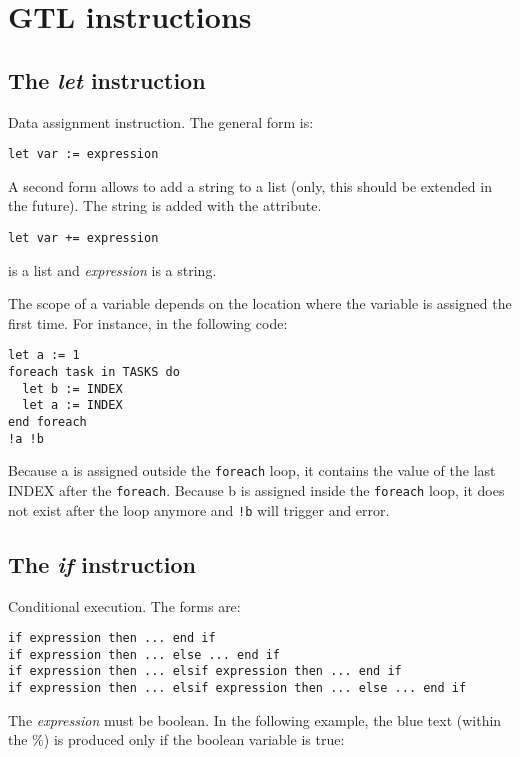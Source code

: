 \section{GTL instructions}

\subsection{The {\em let} instruction}

Data assignment instruction. The general form is:

\begin{lstlisting}
let var := expression
\end{lstlisting}

A second form allows to add a string to a list (only, this should be extended in the future). The string is added with the  attribute.

\begin{lstlisting}
let var += expression
\end{lstlisting}

 is a list and {\em expression} is a string.

The scope of a variable depends on the location where the variable is assigned the first time. For instance, in the following code:

\begin{lstlisting}
let a := 1
foreach task in TASKS do
  let b := INDEX
  let a := INDEX
end foreach
!a !b
\end{lstlisting}

Because a is assigned outside the {\tt foreach} loop, it contains the value of the last INDEX after the {\tt foreach}. Because b is assigned inside the {\tt foreach} loop, it does not exist after the loop anymore and {\tt!b} will trigger and error.


\subsection{The {\em if} instruction}

Conditional execution. The forms are:

\begin{lstlisting}
if expression then ... end if
if expression then ... else ... end if
if expression then ... elsif expression then ... end if
if expression then ... elsif expression then ... else ... end if
\end{lstlisting}    

The {\em expression} must be boolean. In the following example, the blue text (within the \%) is produced only if the  boolean variable is true:

